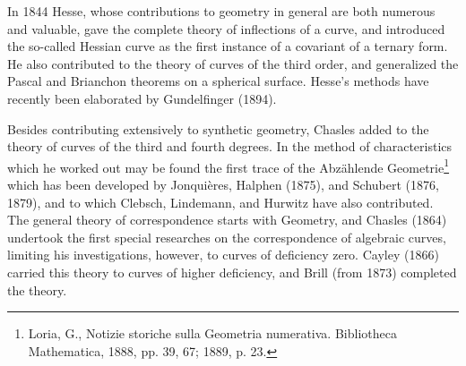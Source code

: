 \documentclass[oneside]{book}
\begin{document}
In 1844 Hesse, whose contributions to geometry in general are both
numerous and valuable, gave the complete theory of inflections of a
curve, and introduced the so-called Hessian curve as the first
instance of a covariant of a ternary form. He also contributed to
the theory of curves of the third order, and generalized the Pascal
and Brianchon theorems on a spherical surface. Hesse's methods have
recently been elaborated by Gundelfinger (1894).

Besides contributing extensively to synthetic geometry, Chasles
added to the theory of curves of the third and fourth degrees. In
the method of characteristics which he worked out may be found the
first trace of the Abz\"ahlende Geometrie\footnote{Loria, G.,
Notizie storiche sulla Geometria numerativa. Bibliotheca Mathematica,
1888, pp. 39, 67; 1889, p. 23.} which has been developed by Jonqui\`eres,
Halphen (1875), and Schubert (1876, 1879), and to which Clebsch, Lindemann,
and Hurwitz have also contributed. The general theory of correspondence starts
with Geometry, and Chasles (1864) undertook the first special
researches on the correspondence of algebraic curves, limiting his
investigations, however, to curves of deficiency zero. Cayley (1866)
carried this theory to curves of higher deficiency, and Brill (from
1873) completed the theory.
\end{document}
